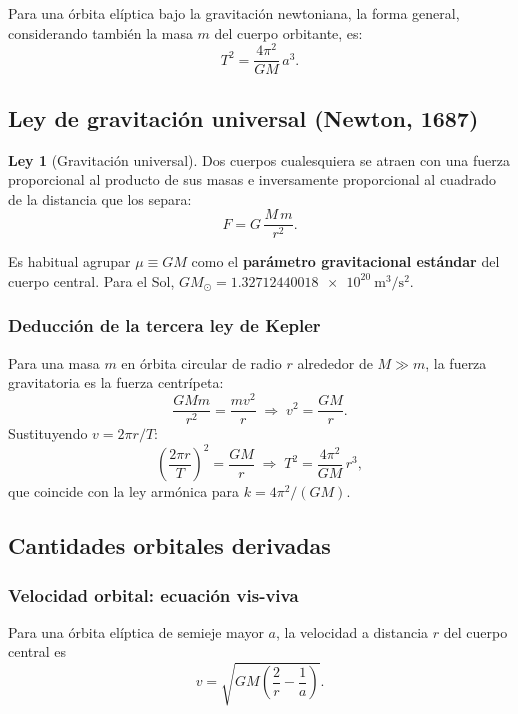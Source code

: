 \documentclass[11pt,a4paper]{article}
\theoremstyle{definition}
\newtheorem{ley}{Ley}
\newcommand{\GMsun}{\ensuremath{GM_{\odot}}}
\begin{document}
Para una órbita elíptica bajo la gravitación newtoniana, la forma general, considerando también la masa $m$ del cuerpo orbitante, es:
\[
  T^{2} = \frac{4\pi^{2}}{GM}\,a^{3}.
\]

\subsection{Ley de gravitación universal (Newton, 1687)}

\begin{ley}[Gravitación universal]
Dos cuerpos cualesquiera se atraen con una fuerza proporcional al producto de sus masas e inversamente proporcional al cuadrado de la distancia que los separa:
\[
  F = G\,\frac{M\,m}{r^{2}}.
\]
\end{ley}

Es habitual agrupar $\mu \equiv GM$ como el \textbf{parámetro gravitacional estándar} del cuerpo central. Para el Sol, $\GMsun = \SI{1.32712440018e20}{\cubic\metre\per\square\second}$.

\subsubsection*{Deducción de la tercera ley de Kepler}

Para una masa $m$ en órbita circular de radio $r$ alrededor de $M\gg m$, la fuerza gravitatoria es la fuerza centrípeta:
\[
  \frac{GMm}{r^{2}} = \frac{mv^{2}}{r}
  \;\Longrightarrow\;
  v^{2} = \frac{GM}{r}.
\]
Sustituyendo $v = 2\pi r/T$:
\[
  \left(\frac{2\pi r}{T}\right)^{2} = \frac{GM}{r}
  \;\Longrightarrow\;
  T^{2} = \frac{4\pi^{2}}{GM}\,r^{3},
\]
que coincide con la ley armónica para $k = 4\pi^{2}/(GM)$.

\subsection{Cantidades orbitales derivadas}

\subsubsection*{Velocidad orbital: ecuación vis-viva}

Para una órbita elíptica de semieje mayor $a$, la velocidad a distancia $r$ del cuerpo central es
\begin{equation}
  v = \sqrt{GM\left(\frac{2}{r} - \frac{1}{a}\right)}.
  \label{eq:visviva}
\end{equation}
\end{document}
